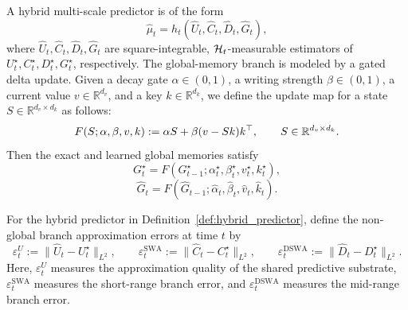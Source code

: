 \begin{definition}
\label{def:hybrid_predictor}
A hybrid multi-scale predictor is of the form
\begin{equation}
\hat\mu_t = h_t(\hat U_t,\hat C_t,\hat D_t,\hat G_t),
\label{eq:learned_predictor}
\end{equation}
where $\hat U_t,\hat C_t,\hat D_t,\hat G_t$ are square-integrable, $\mathcal{H}_t$-measurable estimators of $U_t^\star,C_t^\star,D_t^\star,G_t^\star$, respectively. The global-memory branch is modeled by a gated delta update. Given a decay gate $\alpha \in (0, 1)$, a writing strength $\beta \in (0, 1)$, a current value $v \in \mathbb{R}^{d_v}$, and a key $k \in \mathbb{R}^{d_k}$, we define the update map for a state $S \in \mathbb{R}^{d_v \times d_k}$ as follows:
\begin{equation}
F(S;\alpha,\beta,v,k)
:=
\alpha S + \beta (v-Sk)k^\top,
\qquad
S\in\mathbb{R}^{d_v\times d_k}.
\label{eq:F_map}
\end{equation}
Then the exact and learned global memories satisfy
\begin{equation}
G_t^\star = F(G_{t-1}^\star;\alpha_t^\star,\beta_t^\star,v_t^\star,k_t^\star),
\label{eq:exact_G_update}
\end{equation}
\begin{equation}
\hat G_t = F(\hat G_{t-1};\hat\alpha_t,\hat\beta_t,\hat v_t,\hat k_t).
\label{eq:learned_G_update}
\end{equation}
\end{definition}





\begin{definition}
\label{def:branch_errors}
For the hybrid predictor in Definition~\ref{def:hybrid_predictor}, define the non-global branch
approximation errors at time $t$ by
\begin{equation}
\varepsilon_t^U := \|\hat U_t-U_t^\star\|_{L^2},\qquad
\varepsilon_t^{\mathrm{SWA}} := \|\hat C_t-C_t^\star\|_{L^2},\qquad
\varepsilon_t^{\mathrm{DSWA}} := \|\hat D_t-D_t^\star\|_{L^2}.
\label{eq:branch_error_defs}
\end{equation}
Here, $\varepsilon_t^U$ measures the approximation quality of the shared predictive substrate,
$\varepsilon_t^{\mathrm{SWA}}$ measures the short-range branch error, and
$\varepsilon_t^{\mathrm{DSWA}}$ measures the mid-range branch error.
\end{definition}





